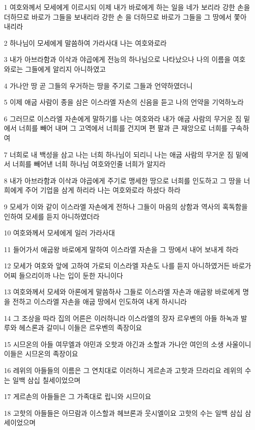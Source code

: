 \par 1 여호와께서 모세에게 이르시되 이제 내가 바로에게 하는 일을 네가 보리라 강한 손을 더하므로 바로가 그들을 보내리라 강한 손 을 더하므로 바로가 그들을 그 땅에서 쫓아 내리라
\par 2 하나님이 모세에게 말씀하여 가라사대 나는 여호와로라
\par 3 내가 아브라함과 이삭과 야곱에게 전능의 하나님으로 나타났으나 나의 이름을 여호와로는 그들에게 알리지 아니하였고
\par 4 가나안 땅 곧 그들의 우거하는 땅을 주기로 그들과 언약하였더니
\par 5 이제 애굽 사람이 종을 삼은 이스라엘 자손의 신음을 듣고 나의 언약을 기억하노라
\par 6 그러므로 이스라엘 자손에게 말하기를 나는 여호와라 내가 애굽 사람의 무거운 짐 밑에서 너희를 빼어 내며 그 고역에서 너희를 건지며 편 팔과 큰 재앙으로 너희를 구속하여
\par 7 너희로 내 백성을 삼고 나는 너희 하나님이 되리니 나는 애굽 사람의 무거운 짐 밑에서 너희를 빼어낸 너희 하나님 여호와인줄 너희가 알지라
\par 8 내가 아브라함과 이삭과 야곱에게 주기로 맹세한 땅으로 너희를 인도하고 그 땅을 너희에게 주어 기업을 삼게 하리라 나는 여호와로라 하셨다 하라
\par 9 모세가 이와 같이 이스라엘 자손에게 전하나 그들이 마음의 상함과 역사의 혹독함을 인하여 모세를 듣지 아니하였더라
\par 10 여호와께서 모세에게 일러 가라사대
\par 11 들어가서 애굽왕 바로에게 말하여 이스라엘 자손을 그 땅에서 내어 보내게 하라
\par 12 모세가 여호와 앞에 고하여 가로되 이스라엘 자손도 나를 듣지 아니하였거든 바로가 어찌 들으리이까 나는 입이 둔한 자니이다
\par 13 여호와께서 모세와 아론에게 말씀하사 그들로 이스라엘 자손과 애굽왕 바로에게 명을 전하고 이스라엘 자손을 애굽 땅에서 인도하여 내게 하시니라
\par 14 그 조상을 따라 집의 어른은 이러하니라 이스라엘의 장자 르우벤의 아들 하녹과 발루와 헤스론과 갈미니 이들은 르우벤의 족장이요
\par 15 시므온의 아들 여무엘과 야민과 오핫과 야긴과 소할과 가나안 여인의 소생 사울이니 이들은 시므온의 족장이요
\par 16 레위의 아들들의 이름은 그 연치대로 이러하니 게르손과 고핫과 므라리요 레위의 수는 일백 삼십 칠세이었으며
\par 17 게르손의 아들들은 그 가족대로 립니와 시므이요
\par 18 고핫의 아들들은 아므람과 이스할과 헤브론과 웃시엘이요 고핫의 수는 일백 삼십 삼세이었으며
